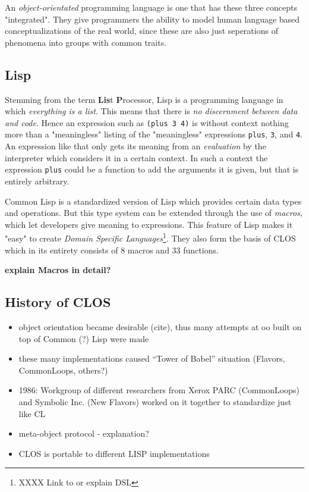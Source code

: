 \documentclass[oribibl]{llncs}
\begin{document}
An \emph{object-orientated} programming language is one that has these three concepts "integrated". They give programmers the ability to model human language based conceptualizations of the real world, since these are also just seperations of phenomena into groups with common traits.

\subsection{Lisp}
\label{sec:lisp}

Stemming from the term \textbf{Lis}t \textbf{P}rocessor, Lisp is a programming language in which \emph{everything is a list}. This means that there is \emph{no discernment between data and code}. Hence an expression such as \texttt{(plus 3 4)} is without context nothing more than a "meaningless" listing of the "meaningless" expressions \texttt{plus}, \texttt{3}, and \texttt{4}. An expression like that only gets its meaning from an \emph{evaluation} by the interpreter which considers it in a certain context. In such a context the expression \texttt{plus} could be a function to add the arguments it is given, but that is entirely arbitrary. 

Common Lisp is a standardized version of Lisp which provides certain data types and operations. But this type system can be extended through the use of \emph{macros}, which let developers give meaning to expressions. This feature of Lisp makes it "easy" to create \emph{Domain Specific Languages}\footnote{XXXX Link to or explain DSL}. \cite{XXX} They also form the basis of CLOS which in its entirety consists of 8 macros and 33 functions.


\textbf{explain Macros in detail?}


\subsection{History of CLOS}
\label{sec:history}

\begin{itemize}
\item object orientation became desirable (cite), thus many attempts at oo built on top of Common (?) Lisp were made
\item these many implementations caused “Tower of Babel” situation (Flavors, CommonLoops, others?)
\item 1986: Workgroup of different researchers from Xerox PARC (CommonLoops) and Symbolic Inc. (New Flavors) worked on it together to standardize just like CL
\item meta-object protocol - explanation?
\item CLOS is portable to different LISP implementations
\end{itemize}
\end{document}
